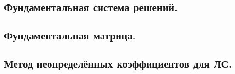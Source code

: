\subsection*{Фундаментальная система решений.}

\subsection*{Фундаментальная матрица.}

\subsection*{Метод неопределённых коэффициентов для ЛС.}










